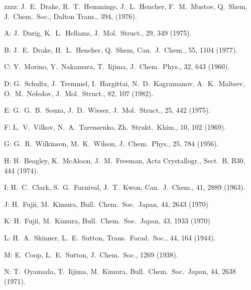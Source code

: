 \begin{description}
\item{zzzz: } J.\ E.\ Drake, R.\ T.\ Hemmings, J.\ L.\ Hencher, F.\ M.\ Mustoe, Q.\ Shem,
       J.\ Chem.\ Soc., Dalton Trans., 394, (1976).
  
\item{   A: } J.\ Durig, K.\ L.\ Hellams, J.\ Mol.\ Struct., 29, 349 (1975).
  
\item{   B: } J.\ E.\ Drake, H.\ L.\ Hencher, Q.\ Shem, Can.\ J.\ Chem., 55, 1104 (1977).
  
\item{   C: } Y.\ Morino, Y.\ Nakamura, T.\ Iijima, J.\ Chem.\ Phys., 32, 643 (1960).
  
\item{   D: } G.\ Schultz, J.\ Tremmel, I.\ Hargittai, N.\ D.\ Kagramanov, A.\ K.\ Maltsev,
       O.\ M.\ Nefedov, J.\ Mol.\ Struct., 82, 107 (1982).
  
\item{   E: } G.\ G.\ B.\ Souza, J.\ D.\ Wieser, J.\ Mol.\ Struct., 25, 442 (1975).
  
\item{   F: } L.\ V.\ Vilkov, N.\ A.\ Tarensenko, Zh.\ Strukt.\ Khim., 10, 102 (1969).
  
\item{   G: } G.\ R.\ Wilkinson, M.\ K.\ Wilson, J.\ Chem.\ Phys., 25, 784 (1956).
  
\item{   H: } B.\ Beagley, K.\ McAloon, J.\ M.\ Freeman, Acta Crystallogr.,
       Sect.\ B, B30, 444 (1974).
  
\item{   I: } H.\ C.\ Clark, S.\ G.\ Furnival, J.\ T.\ Kwon, Can.\ J.\ Chem., 41, 2889 (1963).
  
\item{   J: } H.\ Fujii, M.\ Kimura, Bull.\ Chem.\ Soc.\ Japan, 44, 2643 (1970)
  
\item{   K: } H.\ Fujii, M.\ Kimura, Bull.\ Chem.\ Soc.\ Japan, 43, 1933 (1970)
  
\item{   L: } H.\ A.\ Skinner, L.\ E.\ Sutton, Trans.\ Farad.\ Soc., 44, 164 (1944).
  
\item{   M: } E.\ Coop, L.\ E.\ Sutton, J.\ Chem.\ Soc., 1269 (1938).
  
\item{   N: } T.\ Oyamada, T.\ Iijima, M.\ Kimura, Bull.\ Chem.\ Soc.\ Japan, 44, 2638 (1971).
  

\end{description}
